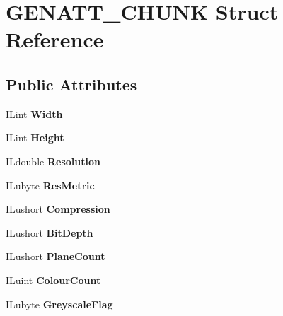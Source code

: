 \hypertarget{structGENATT__CHUNK}{}\section{G\+E\+N\+A\+T\+T\+\_\+\+C\+H\+U\+NK Struct Reference}
\label{structGENATT__CHUNK}
\subsection*{Public Attributes}
\begin{DoxyCompactItemize}
\item 
\mbox{\label{structGENATT__CHUNK_a9973d2ddc30ab78ab1d79bd44abc9d77}} 
I\+Lint {\bfseries Width}
\item 
\mbox{\label{structGENATT__CHUNK_a52e3e43634b9b723f727b554694be063}} 
I\+Lint {\bfseries Height}
\item 
\mbox{\label{structGENATT__CHUNK_a64c48c434514e24ffadf889f7a29691a}} 
I\+Ldouble {\bfseries Resolution}
\item 
\mbox{\label{structGENATT__CHUNK_a5245c0b25ab7d45ebe2dc7826a626f5f}} 
I\+Lubyte {\bfseries Res\+Metric}
\item 
\mbox{\label{structGENATT__CHUNK_af692af9cddd8c1a03f2f6a8f6124b174}} 
I\+Lushort {\bfseries Compression}
\item 
\mbox{\label{structGENATT__CHUNK_a656ea1013f6d2b3f351a3715cdae98a9}} 
I\+Lushort {\bfseries Bit\+Depth}
\item 
\mbox{\label{structGENATT__CHUNK_a965f1ae4bed0eeceb41bde105f05938e}} 
I\+Lushort {\bfseries Plane\+Count}
\item 
\mbox{\label{structGENATT__CHUNK_a538dd7fc2f6a98f8dfcb6029450550ff}} 
I\+Luint {\bfseries Colour\+Count}
\item 
\mbox{\label{structGENATT__CHUNK_ac1fea59ab7e2ffb6780aa18012fcec3f}} 
I\+Lubyte {\bfseries Greyscale\+Flag}
\item 

\end{DoxyCompactItemize}
